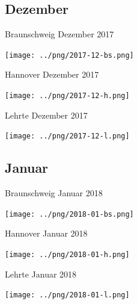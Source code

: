 \documentclass[aspectratio=169]{beamer} %
\begin{document}
\subsection{Dezember}
\begin{frame}{Braunschweig Dezember 2017}
  \begin{center}
    \texttt{[image: ../png/2017-12-bs.png]}
  \end{center}
\end{frame}
\begin{frame}{Hannover \hspace{4cm} Dezember 2017}
  \begin{center}
    \texttt{[image: ../png/2017-12-h.png]}
  \end{center}
\end{frame}
\begin{frame}{Lehrte \hspace{2cm} Dezember 2017}
  \begin{center}
    \texttt{[image: ../png/2017-12-l.png]}
  \end{center}
\end{frame}

\subsection{Januar}
\begin{frame}{Braunschweig Januar 2018}
  \begin{center}
    \texttt{[image: ../png/2018-01-bs.png]}
  \end{center}
\end{frame}
\begin{frame}{Hannover \hspace{4cm} Januar 2018}
  \begin{center}
    \texttt{[image: ../png/2018-01-h.png]}
  \end{center}
\end{frame}
\begin{frame}{Lehrte \hspace{2cm} Januar 2018}
  \begin{center}
    \texttt{[image: ../png/2018-01-l.png]}
  \end{center}
\end{frame}
\end{document}
